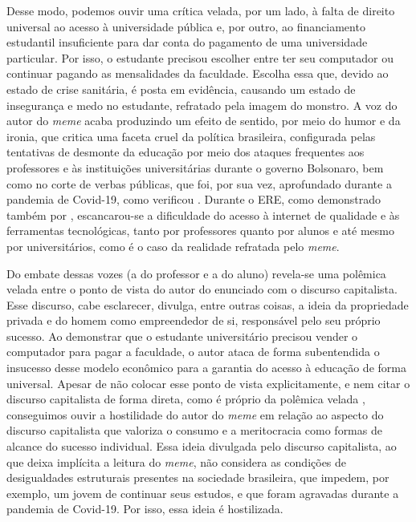 \documentclass[portuguese]{textolivre}
\begin{document}
Desse modo, podemos ouvir uma crítica velada, por um lado, à falta de direito universal ao acesso à universidade pública e, por outro, ao financiamento estudantil insuficiente para dar conta do pagamento de uma universidade particular. Por isso, o estudante precisou escolher entre ter seu computador ou continuar pagando as mensalidades da faculdade. Escolha essa que, devido ao estado de crise sanitária, é posta em evidência, causando um estado de insegurança e medo no estudante, refratado pela imagem do monstro. A voz do autor do \textit{meme} acaba produzindo um efeito de sentido, por meio do humor e da ironia, que critica uma faceta cruel da política brasileira, configurada pelas tentativas de desmonte da educação por meio dos ataques frequentes aos professores e às instituições universitárias durante o governo Bolsonaro, bem como no corte de verbas públicas, que foi, por sua vez, aprofundado durante a pandemia de Covid-19, como verificou \textcite{araujo2022projeto}. Durante o ERE, como demonstrado também por \textcite{costa2022estudo}, escancarou-se a dificuldade do acesso à internet de qualidade e às ferramentas tecnológicas, tanto por professores quanto por alunos e até mesmo por universitários, como é o caso da realidade refratada pelo \textit{meme}.
	
Do embate dessas vozes (a do professor e a do aluno) revela-se uma polêmica velada entre o ponto de vista do autor do enunciado com o discurso capitalista. Esse discurso, cabe esclarecer, divulga, entre outras coisas, a ideia da propriedade privada e do homem como empreendedor de si, responsável pelo seu próprio sucesso. Ao demonstrar que o estudante universitário precisou vender o computador para pagar a faculdade, o autor ataca de forma subentendida o insucesso desse modelo econômico para a garantia do acesso à educação de forma universal. Apesar de não colocar esse ponto de vista explicitamente, e nem citar o discurso capitalista de forma direta, como é próprio da polêmica velada \cite{bakhtin2018problemas}, conseguimos ouvir a hostilidade do autor do \textit{meme} em relação ao aspecto do discurso capitalista que valoriza o consumo e a meritocracia como formas de alcance do sucesso individual. Essa ideia divulgada pelo discurso capitalista, ao que deixa implícita a leitura do \textit{meme}, não considera as condições de desigualdades estruturais presentes na sociedade brasileira, que impedem, por exemplo, um jovem de continuar seus estudos, e que foram agravadas durante a pandemia de Covid-19. Por isso, essa ideia é hostilizada.
	
\end{document}
